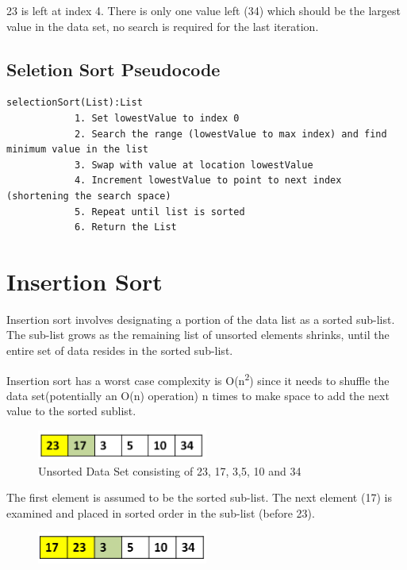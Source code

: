 23 is left  at index 4. There is only one value left (34) which should be the largest value in the data set, no search is required for the last iteration.

\subsection{Seletion Sort Pseudocode}

\begin{lstlisting}
selectionSort(List):List
            1. Set lowestValue to index 0
            2. Search the range (lowestValue to max index) and find minimum value in the list
            3. Swap with value at location lowestValue
            4. Increment lowestValue to point to next index (shortening the search space)
            5. Repeat until list is sorted
            6. Return the List
\end{lstlisting}


\section{Insertion Sort}
Insertion sort involves designating a portion of the data list as a sorted sub-list.  The sub-list grows as the remaining list of unsorted elements shrinks, until the entire set of data resides in  the sorted sub-list. \newline

Insertion sort has a worst case complexity is O(n\textsuperscript{2}) since it needs to shuffle the data set(potentially an O(n) operation) n times to make space to add the next value to the sorted sublist. \newline

\begin{figure}[H]
\centering
\includegraphics[width=0.5\textwidth]{pictures/insert1.png}
\caption{Unsorted Data Set consisting of 23, 17, 3,5, 10 and 34}
\label{fig:insert1}
\end{figure}

The first element is assumed to be the  sorted sub-list.   The next element (17) is examined and placed  in sorted order in the sub-list  (before 23).

\begin{figure}[H]
\centering
\includegraphics[width=0.5\textwidth]{pictures/insert2.png}
\label{fig:insert2}
\end{figure}

